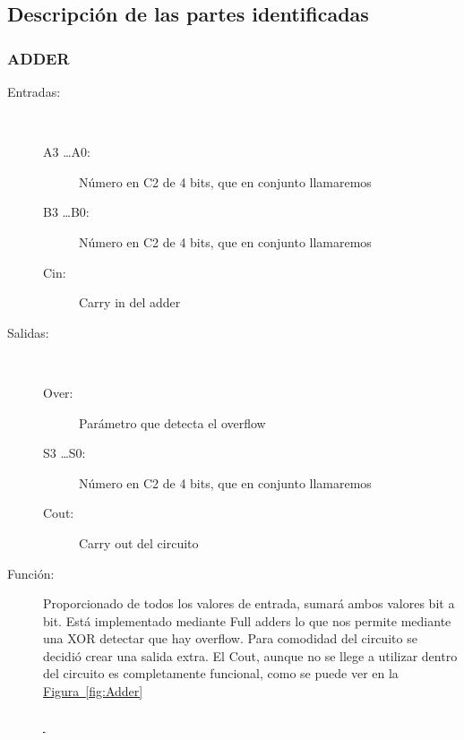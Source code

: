 \documentclass{article}
\newcommand*{\figref}[2][]{
  \hyperref[{fig:#2}]{
    Figura~\ref*{fig:#2}
    \ifx\\#1\\%
    \else
      \,#1
    \fi
  }
}
\begin{document}
\subsection{Descripción de las partes identificadas}

\subsubsection{ADDER}
\label{sec:ADDER}
\begin{description}

    \item[Entradas: ]  
    \begin{description}
        \item[A3 \dots A0:] Número en C2 de 4 bits, que en conjunto llamaremos 
        \item[B3 \dots B0:] Número en C2 de 4 bits, que en conjunto llamaremos 
        \item[Cin:] Carry in del adder
    \end{description}
    
    \item[Salidas: ] 
    \begin{description}
        \item[Over:] Parámetro que detecta el overflow
        \item[S3 \dots S0:] Número en C2 de 4 bits, que en conjunto llamaremos 
        \item[Cout:] Carry out del circuito
    \end{description}
    
    \item[Función: ]Proporcionado de todos los valores de entrada, sumará ambos valores bit a bit. Está implementado mediante Full adders lo que nos permite mediante una XOR detectar que hay overflow. Para comodidad del circuito se decidió crear una salida extra. El Cout, aunque no se llege a utilizar dentro del circuito es completamente funcional, como se puede ver en la\figref{Adder}
\end{description}
\newpage
\end{document}
